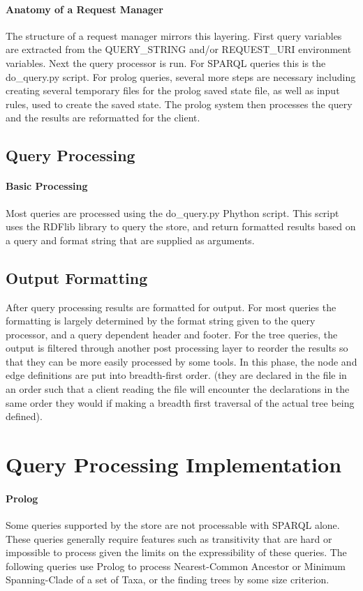 \documentclass[10pt]{article}
\begin{document}
     \paragraph{Anatomy of a Request Manager}
      The structure of a request manager mirrors this layering. First query variables are extracted from the QUERY\_STRING
      and/or REQUEST\_URI environment variables. 
      Next the query processor is run. For SPARQL queries this is the do\_query.py script. For prolog queries, several more
      steps are necessary including creating several temporary files for the prolog saved state file, as well as input rules, 
      used to create the saved state. The prolog system then processes the query and the results are reformatted for the client.
  \subsection{Query Processing}
     \paragraph{Basic Processing} Most queries are processed using the do\_query.py Phython script. This script uses the RDFlib
     library to query the store, and return formatted results based on a query and format string that
     are supplied as arguments.
     
 
  \subsection{Output Formatting}
     After query processing results are formatted for output. For most queries the formatting is largely
     determined by the format string given to the query processor, and a query dependent header and footer.
     For the tree queries, the output is filtered through another post processing layer to reorder the 
     results so that they can be more easily processed by some tools. In this phase, the node and edge
     definitions are put into breadth-first order. (they are declared in the file in an order such that
     a client reading the file will encounter the declarations in the same order they would if making a
     breadth first traversal of the actual tree being defined).



\section{Query Processing Implementation}
    \paragraph{Prolog} Some queries supported by the store are not processable with SPARQL alone. These queries generally
      require features such as transitivity that are hard or impossible to process given the limits on the expressibility 
      of these queries. The following queries use Prolog to process Nearest-Common Ancestor or Minimum Spanning-Clade of a
      set of Taxa, or the finding trees by some size criterion. 
\end{document}
